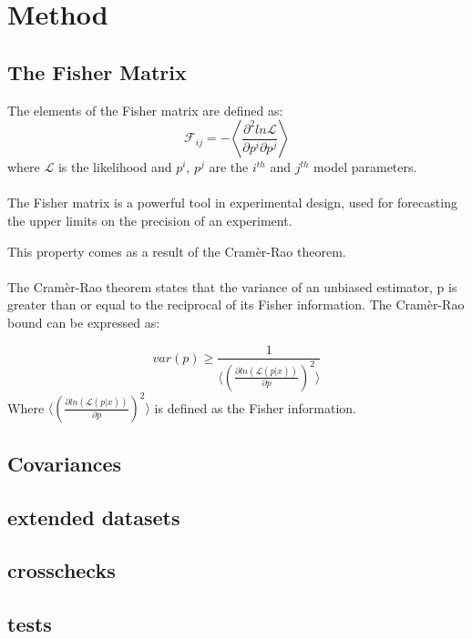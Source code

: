 \section{Method}
\subsection{The Fisher Matrix}
The elements of the Fisher matrix are defined as:
\begin{equation}
\mathcal{F}_{ij} = - \left \langle \frac{\partial^{2}ln{\mathcal{L}}}{\partial p^i\partial p^j } \right \rangle
\end{equation}
where $\mathcal{L}$ is the likelihood and $p^{i}$, $p^{j}$ are the $i^{th}$ and $j^{th}$ model parameters.
\\\\
The Fisher matrix is a powerful tool in experimental design, used for forecasting the upper limits on the precision of an experiment. 








This property comes as a result of the Cram\`{e}r-Rao theorem.
\\\\
The Cram\`{e}r-Rao theorem states that the variance of an unbiased estimator, p is greater than or equal to the reciprocal of its Fisher information. The Cram\`{e}r-Rao bound can be expressed as:

\begin{equation}
var(p) \geq \frac{1}{\langle (\frac{\partial ln(\mathcal{L}(p \vert x))}{\partial p})^2 \rangle}
\end{equation}
Where $\langle (\frac{\partial ln(\mathcal{L}(p \vert x))}{\partial p})^2 \rangle$ is defined as the Fisher information.



\subsection{Covariances}
\subsection{extended datasets}
\subsection{crosschecks}
\subsection{tests}
